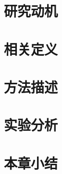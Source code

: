 \section{研究动机}
\label{sec5:motivation}

\section{相关定义}
\label{sec5:definition}

\section{方法描述}
\label{sec5:method}

\section{实验分析}
\label{sec5:experiment}

\section{本章小结}
\label{sec5:conclusion}